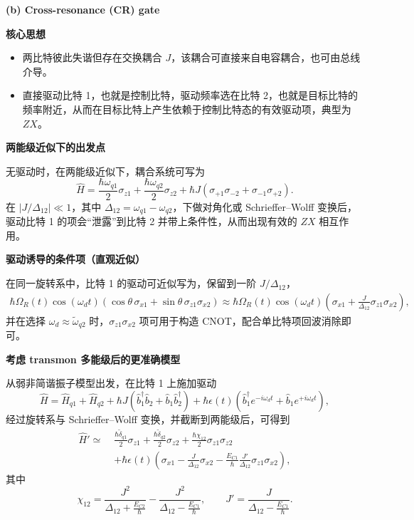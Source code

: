 \documentclass[12pt,a4paper,oneside]{ctexbook}
\begin{document}
\noindent\textbf{(b) Cross-resonance (CR) gate}

\noindent\textbf{核心思想}

\begin{itemize}
  \item 两比特彼此失谐但存在交换耦合 $J$，该耦合可直接来自电容耦合，也可由总线介导。
  \item 直接驱动比特 1，也就是控制比特，驱动频率选在比特 2，也就是目标比特的频率附近，从而在目标比特上产生依赖于控制比特态的有效驱动项，典型为 $ZX$。
\end{itemize}

\noindent\textbf{两能级近似下的出发点}

无驱动时，在两能级近似下，耦合系统可写为
\begin{equation}
  \hat H
  =
  \frac{\hbar\omega_{q1}}{2}\sigma_{z1}
  +\frac{\hbar\omega_{q2}}{2}\sigma_{z2}
  +\hbar J\left(\sigma_{+1}\sigma_{-2}+\sigma_{-1}\sigma_{+2}\right).
  \tag{143}
\end{equation}
在 $|J/\Delta_{12}|\ll 1$，其中 $\Delta_{12}=\omega_{q1}-\omega_{q2}$，下做对角化或 Schrieffer--Wolff 变换后，驱动比特 1 的项会“泄露”到比特 2 并带上条件性，从而出现有效的 $ZX$ 相互作用。

\noindent\textbf{驱动诱导的条件项（直观近似）}

在同一旋转系中，比特 1 的驱动可近似写为，保留到一阶 $J/\Delta_{12}$，
\begin{align}
  \hbar\Omega_R(t)\cos(\omega_d t)\left(\cos\theta\,\sigma_{x1}+\sin\theta\,\sigma_{z1}\sigma_{x2}\right)
  \approx
  \hbar\Omega_R(t)\cos(\omega_d t)
  \left(\sigma_{x1}+\frac{J}{\Delta_{12}}\sigma_{z1}\sigma_{x2}\right),
  \tag{144}
\end{align}
并在选择 $\omega_d\approx \tilde\omega_{q2}$ 时，$\sigma_{z1}\sigma_{x2}$ 项可用于构造 CNOT，配合单比特项回波消除即可。

\noindent\textbf{考虑 transmon 多能级后的更准确模型}

从弱非简谐振子模型出发，在比特 1 上施加驱动
\begin{equation}
  \hat H
  =
  \hat H_{q1}+\hat H_{q2}
  +\hbar J(\hat b_1^\dagger\hat b_2+\hat b_1\hat b_2^\dagger)
  +\hbar\epsilon(t)\!\left(\hat b_1^\dagger e^{-i\omega_d t}+\hat b_1 e^{+i\omega_d t}\right),
  \tag{145}
\end{equation}
经过旋转系与 Schrieffer--Wolff 变换，并截断到两能级后，可得到
\begin{align}
  \hat H'
  \simeq\;
  &\frac{\hbar\tilde\delta_{q1}}{2}\sigma_{z1}
  +\frac{\hbar\tilde\delta_{q2}}{2}\sigma_{z2}
  +\frac{\hbar\chi_{12}}{2}\sigma_{z1}\sigma_{z2}
  \nonumber\\
  &+\hbar\epsilon(t)\!\left(
    \sigma_{x1}
    -\frac{J}{\Delta_{12}}\sigma_{x2}
    -\frac{E_{C1}}{\hbar}\frac{J'}{\Delta_{12}}\sigma_{z1}\sigma_{x2}
  \right),
  \tag{146}
\end{align}
其中
\begin{equation}
  \chi_{12}
  =
  \frac{J^2}{\Delta_{12}+\frac{E_{C2}}{\hbar}}
  -
  \frac{J^2}{\Delta_{12}-\frac{E_{C1}}{\hbar}},
  \qquad
  J'=\frac{J}{\Delta_{12}-\frac{E_{C1}}{\hbar}}.
  \tag{147}
\end{equation}
\end{document}
